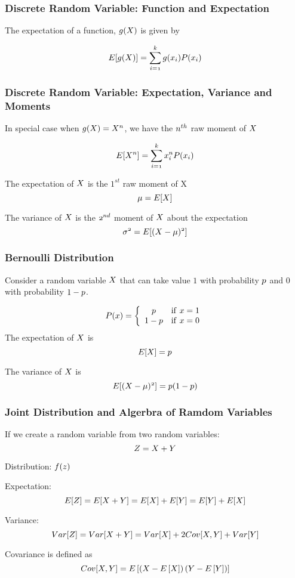 \documentclass[notheorems, aspectratio=54]{beamer}
\begin{document}
\begin{frame}
\frametitle{Discrete Random Variable: Function and Expectation}
The expectation of a function, $\mathnormal{g(X)}$ is given by 

$$\mathnormal{E[g(X)]=\sum_{i=1}^kg(x_i)P(x_i)}$$
\end{frame}
\begin{frame}

\frametitle{Discrete Random Variable: Expectation, Variance and Moments}
In special case when $\mathnormal{g(X)=X^{n}}$, we have the $\mathnormal{n^{th}}$ raw moment of $\mathnormal{X}$

$$\mathnormal{E[X^{n}]=\sum_{i=1}^{k} x_{i}^{n} P(x_i)}$$

The expectation of $\mathnormal{X}$ is the $1^{st}$ raw moment of X 
$$\mathnormal{\mu=E[X]}$$
 
The variance of $\mathnormal{X}$ is the $\mathnormal{2^{nd}}$ moment of $\mathnormal{X}$ about the expectation  $$\mathnormal{\sigma^{2}=E[(X-\mu)^{2}]}$$
\end{frame}


\begin{frame}
\frametitle{Bernoulli Distribution}
Consider a random variable $\mathnormal{X}$ that can take value $1$ with probability $\mathnormal{p}$ and $0$ with probability $1-\mathnormal{p}$.

$$    
\mathnormal{P(x)} =
    \left\{
        \begin{array}{cc}
                \mathnormal{p} & \mathrm{if\ } \mathnormal{x}=1 \\
                1-\mathnormal{p} & \mathrm{if\ } \mathnormal{x}=0 \\
        \end{array} 
    \right.
$$
The expectation of $\mathnormal{X}$ is 
$$
\mathnormal{E[X]=p}
$$

The variance of $\mathnormal{X}$ is
$$
\mathnormal{E[(X-\mu)^2]}=\mathnormal{p}(1-\mathnormal{p})
$$
\end{frame}


\begin{frame}
\frametitle{Joint Distribution and Algerbra of Ramdom Variables}
If we create a random variable from two random variables: $$\mathnormal{Z=X+Y}$$

Distribution: $\mathnormal{f(z)}$

Expectation: $$\mathnormal{E[Z]=E[X+Y]=E[X]+E[Y]=E[Y]+E[X]}$$

Variance:
$$\mathnormal{Var[Z]}=\mathnormal{Var[X+Y]}=\mathnormal{Var[X]}+2\mathnormal{Cov[X,Y]}+\mathnormal{Var[Y]}$$

Covariance is defined as 
$$\mathnormal{{Cov}[X, Y]
={E}\left[\left(X - {E}\left[X\right]\right) \left(Y - {E}\left[Y\right]\right)\right]}$$
\end{frame}
\end{document}
